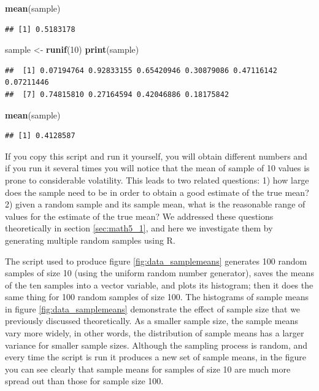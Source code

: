 \documentclass[
]{book}
\newenvironment{Shaded}{\begin{snugshade}}{\end{snugshade}}
\newcommand{\DecValTok}[1]{\textcolor[rgb]{0.00,0.00,0.81}{#1}}
\newcommand{\KeywordTok}[1]{\textcolor[rgb]{0.13,0.29,0.53}{\textbf{#1}}}
\newcommand{\NormalTok}[1]{#1}
\newcommand{\StringTok}[1]{\textcolor[rgb]{0.31,0.60,0.02}{#1}}
\theoremstyle{definition}
\theoremstyle{definition}
\theoremstyle{definition}
\theoremstyle{remark}
\begin{document}
\begin{Shaded}
\begin{Highlighting}[]
\KeywordTok{mean}\NormalTok{(sample)}
\end{Highlighting}
\end{Shaded}

\begin{verbatim}
## [1] 0.5183178
\end{verbatim}

\begin{Shaded}
\begin{Highlighting}[]
\NormalTok{sample \textless{}{-}}\StringTok{ }\KeywordTok{runif}\NormalTok{(}\DecValTok{10}\NormalTok{)}
\KeywordTok{print}\NormalTok{(sample)}
\end{Highlighting}
\end{Shaded}

\begin{verbatim}
##  [1] 0.07194764 0.92833155 0.65420946 0.30879086 0.47116142 0.07211446
##  [7] 0.74815810 0.27164594 0.42046886 0.18175842
\end{verbatim}

\begin{Shaded}
\begin{Highlighting}[]
\KeywordTok{mean}\NormalTok{(sample)}
\end{Highlighting}
\end{Shaded}

\begin{verbatim}
## [1] 0.4128587
\end{verbatim}

If you copy this script and run it yourself, you will obtain different numbers and if you run it several times you will notice that the mean of sample of 10 values is prone to considerable volatility. This leads to two related questions: 1) how large does the sample need to be in order to obtain a good estimate of the true mean? 2) given a random sample and its sample mean, what is the reasonable range of values for the estimate of the true mean? We addressed these questions theoretically in section \ref{sec:math5_1}, and here we investigate them by generating multiple random samples using R.

The script used to produce figure \ref{fig:data_samplemeans} generates 100 random samples of size 10 (using the uniform random number generator), saves the means of the ten samples into a vector variable, and plots its histogram; then it does the same thing for 100 random samples of size 100. The histograms of sample means in figure \ref{fig:data_samplemeans} demonstrate the effect of sample size that we previously discussed theoretically. As a smaller sample size, the sample means vary more widely, in other words, the distribution of sample means has a larger variance for smaller sample sizes. Although the sampling process is random, and every time the script is run it produces a new set of sample means, in the figure you can see clearly that sample means for samples of size 10 are much more spread out than those for sample size 100.
\end{document}
